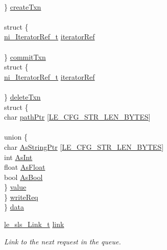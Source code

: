 \begin{DoxyCompactItemize}
\begin{tabbing}
\>\>\\
\>\} \hyperlink{struct_update_request__t_a7f0e0358c6dbbf9f2f755395e53fbba0}{createTxn}\\
\>\>\\
\>struct \{\\
\>\>\hyperlink{node_iterator_8h_a4e97d8e792de584da776be7c732785ba}{ni\_IteratorRef\_t} \hyperlink{struct_update_request__t_af3cccbf7d85cccd6a16aedb3d96d4c14}{iteratorRef}\\
\>\>\\
\>\} \hyperlink{struct_update_request__t_a95fde185952ed8aa46b7280e4bc5d388}{commitTxn}\\
\>struct \{\\
\>\>\hyperlink{node_iterator_8h_a4e97d8e792de584da776be7c732785ba}{ni\_IteratorRef\_t} \hyperlink{struct_update_request__t_af3cccbf7d85cccd6a16aedb3d96d4c14}{iteratorRef}\\
\>\>\\
\>\} \hyperlink{struct_update_request__t_ac49ff4cdeb64dd0ed694ded17b6f12fb}{deleteTxn}\\
\>struct \{\\
\>\>char \hyperlink{struct_update_request__t_ac9600d408f928f392b6acb3f03d88b56}{pathPtr} \mbox{[}\hyperlink{le__cfg__interface_8h_aea00ee500b7beccc4bf46ab637190a55}{LE\_CFG\_STR\_LEN\_BYTES}\mbox{]}\\
\>\>\\
\>\>union \{\\
\>\>\>char \hyperlink{struct_update_request__t_ae2b7f457e51e3b9f05cba1f13c19222e}{AsStringPtr} \mbox{[}\hyperlink{le__cfg__interface_8h_aea00ee500b7beccc4bf46ab637190a55}{LE\_CFG\_STR\_LEN\_BYTES}\mbox{]}\\
\>\>\>int \hyperlink{struct_update_request__t_adb1133dfc14bf4aec2a50a8b842d0cbe}{AsInt}\\
\>\>\>float \hyperlink{struct_update_request__t_aa2096bedb70242699586abb7e8e71a20}{AsFloat}\\
\>\>\>bool \hyperlink{struct_update_request__t_a955b1fec93f6f5ebbf79ec4b54f0a59c}{AsBool}\\
\>\>\} \hyperlink{struct_update_request__t_ab004c43fda7d5ae05b381453596452df}{value}\\
\>\} \hyperlink{struct_update_request__t_ab1fda0ec3b5afde781bff9e76ca84514}{writeReq}\\
\} \hyperlink{struct_update_request__t_aa8ef0aa88764ea6c600c99e725194763}{data}\\

\end{tabbing}\item 
\hyperlink{structle__sls___link__t}{le\+\_\+sls\+\_\+\+Link\+\_\+t} \hyperlink{struct_update_request__t_a8514eb07a422bebf8ba8db2d81d45716}{link}
\begin{DoxyCompactList}\small\item\em Link to the next request in the queue. \end{DoxyCompactList}\end{DoxyCompactItemize}



